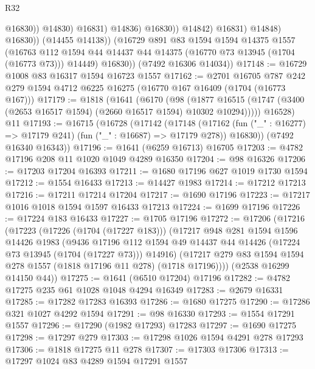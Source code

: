 \begin{lexlean}{R32}
\begin{coremodule}
                                  @16830))
                              @14830)
                            @16831)
                          @14836)
                        @16830))
                    @14842)
                  @16831)
                @14848)
              @16830))
          (@14455 @14138))
        (@16729
          @891
          @83
          @1594
          @1594
          @14375
          @1557
          (@16763 @112 @1594 @44 @14437 @44 @14375 (@16770 @73 @13945 (@1704 (@16773 @73))) @14449)
          @16830))
      (@7492 @16306 @14034))
@17148 := @16729 @1008 @83 @16317 @1594 @16723 @1557
@17162 := @2701
    @16705
    @787
    @242
    @279
    @1594
    @4712
    @6225
    @16275
    (@16770 @167 @16409 (@1704 (@16773 @167)))
@17179 := @1818
    (@1641
      (@6170
        (@98
          (@1877 @16515 (@1747 (@3400 (@2653 @16517 @1594) (@2660 @16517 @1594) @10302 @10294)))))
      @16528)
    @11
@17193 := @16715
    (@16728
      (@17142
        (@17148
          (@17162 (fun ("_" : @16277) => @17179 @241) (fun ("_" : @16687) => @17179 @278))
          @16830))
      (@7492 @16340 @16343))
@17196 := @1641 (@6259 @16713) @16705
@17203 := @4782 @17196 @208 @11 @1020 @1049 @4289 @16350
@17204 := @98 @16326
@17206 := @17203 @17204 @16393
@17211 := @1680 @17196 @627 @1019 @1730 @1594
@17212 := @1554 @16433
@17213 := @14427 @1983
@17214 := @17212 @17213
@17216 := @17211 @17214 @17204
@17217 := @1690 @17196
@17223 := @17217 @1016 @1018 @1594 @1597 @16433 @17213
@17224 := @1699 @17196
@17226 := @17224 @183 @16433
@17227 := @1705 @17196
@17272 := @17206
    (@17216
      (@17223
        (@17226 (@1704 (@17227 @183)))
        (@17217
          @948
          @281
          @1594
          @1596
          @14426
          @1983
          (@9436
            @17196
            @112
            @1594
            @49
            @14437
            @44
            @14426
            (@17224 @73 @13945 (@1704 (@17227 @73)))
            @14916)
          (@17217 @279 @83 @1594 @1594 @278 @1557 (@1818 @17196 @11 @278) (@1718 @17196))))
      (@2538 @16299 @14150 @44))
@17275 := @1641 (@6510 @17204) @17196
@17282 := @4782 @17275 @235 @61 @1028 @1048 @4294 @16349
@17283 := @2679 @16331
@17285 := @17282 @17283 @16393
@17286 := @1680 @17275
@17290 := @17286 @321 @1027 @4292 @1594
@17291 := @98 @16330
@17293 := @1554 @17291 @1557
@17296 := @17290 (@1982 @17293) @17283
@17297 := @1690 @17275
@17298 := @17297 @279
@17303 := @17298 @1026 @1594 @4291 @278 @17293
@17306 := @1818 @17275 @11 @278
@17307 := @17303 @17306
@17313 := @17297 @1024 @83 @4289 @1594 @17291 @1557

\end{coremodule}
\end{lexlean}
